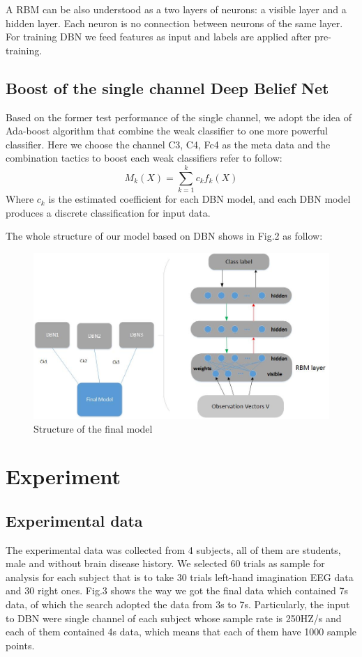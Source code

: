 \documentclass{llncs}
\begin{document}
A RBM can be also understood as a two layers of neurons: a visible layer and a hidden layer. Each neuron is no connection between neurons of the same layer. For training DBN we feed features as input and labels are applied after pre-training.


\subsection{Boost of the single channel Deep Belief Net}
Based on the former test performance of the single channel, we adopt the idea of Ada-boost algorithm\cite{8} that combine the weak classifier to one more powerful classifier\cite{19}\cite{20}. Here we choose the channel C3, C4, Fc4 as the meta data and the combination tactics to boost each weak classifiers refer to follow\cite{15}\cite{16}:
\begin{equation}
M_k(X)=\sum_{k=1}^{k} c_kf_k(X)
\end{equation}                                                                           
Where $c_k$ is the estimated coefficient for each DBN model, and each DBN model produces a discrete classification for input data\cite{17}.


The whole structure of our model based on DBN shows in Fig.2 as follow:
\begin{figure}[!htbp]
	\centering 
		\includegraphics[scale=0.36]{figs/ax11.jpg}
		\caption{Structure of the final model} 
    	\label{fig:2}
\end{figure}


\section{Experiment}
\subsection{Experimental data}
The experimental data was collected from 4 subjects, all of them are students, male and without brain disease history. We selected 60 trials as sample for analysis for each subject that is to take 30 trials left-hand imagination EEG data and 30 right ones. Fig.3 shows the way we got the final data which contained 7s data, of which the search adopted the data from 3s to 7s. Particularly, the input to DBN were single channel of each subject whose sample rate is 250HZ/s and each of them contained 4s data, which means that each of them have 1000 sample points. 
\end{document}
